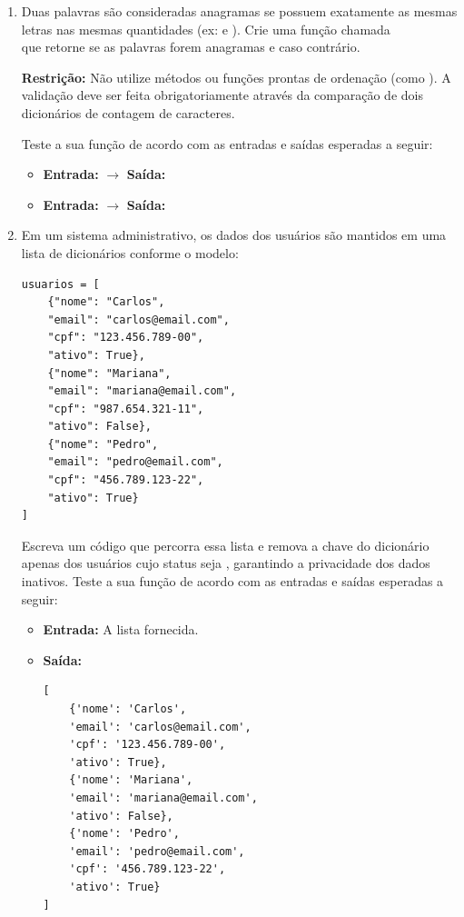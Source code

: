\begin{enumerate}[label=\textbf{Q\arabic*.}]



\item Duas palavras são consideradas anagramas se possuem exatamente as mesmas letras nas mesmas quantidades (ex:  e ). Crie uma função chamada \\ que retorne  se as palavras forem anagramas e  caso contrário.

\textbf{Restrição:} Não utilize métodos ou funções prontas de ordenação (como ). A validação deve ser feita obrigatoriamente através da comparação de dois dicionários de contagem de caracteres.

Teste a sua função de acordo com as entradas e saídas esperadas a seguir:

\begin{itemize}
    \item \textbf{Entrada:}  $\rightarrow$ \textbf{Saída:} 
    \item \textbf{Entrada:}  $\rightarrow$ \textbf{Saída:} 
\end{itemize}




\item Em um sistema administrativo, os dados dos usuários são mantidos em uma lista de dicionários conforme o modelo:
\begin{verbatim}
usuarios = [
    {"nome": "Carlos", 
    "email": "carlos@email.com", 
    "cpf": "123.456.789-00", 
    "ativo": True},
    {"nome": "Mariana", 
    "email": "mariana@email.com", 
    "cpf": "987.654.321-11", 
    "ativo": False},
    {"nome": "Pedro", 
    "email": "pedro@email.com", 
    "cpf": "456.789.123-22", 
    "ativo": True}
]
\end{verbatim}
Escreva um código que percorra essa lista e remova a chave  do dicionário apenas dos usuários cujo status  seja , garantindo a privacidade dos dados inativos.
Teste a sua função de acordo com as entradas e saídas esperadas a seguir:

\begin{itemize}
    \item \textbf{Entrada:} A lista  fornecida.
    \item \textbf{Saída:} 
    \begin{verbatim}
[
    {'nome': 'Carlos', 
    'email': 'carlos@email.com', 
    'cpf': '123.456.789-00', 
    'ativo': True},
    {'nome': 'Mariana', 
    'email': 'mariana@email.com', 
    'ativo': False},
    {'nome': 'Pedro', 
    'email': 'pedro@email.com', 
    'cpf': '456.789.123-22', 
    'ativo': True}
]
    \end{verbatim}
\end{itemize}


\end{enumerate}
